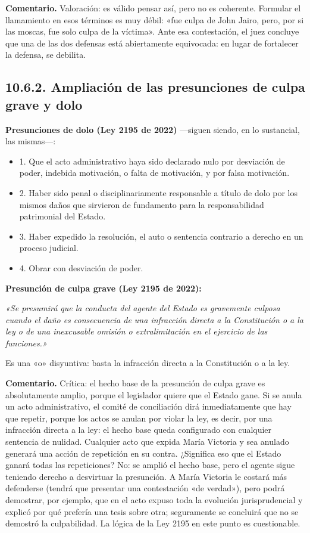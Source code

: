 \begin{comentario}
\textcolor[HTML]{8A6D3B}{\textbf{Comentario. }}Valoración: es válido pensar así, pero no es coherente. Formular el llamamiento en esos términos es muy débil: «fue culpa de John Jairo, pero, por si las moscas, fue solo culpa de la víctima». Ante esa contestación, el juez concluye que una de las dos defensas está abiertamente equivocada: en lugar de fortalecer la defensa, se debilita.
\end{comentario}
\subsection{10.6.2. Ampliación de las presunciones de culpa grave y dolo}
\textbf{Presunciones de dolo (Ley 2195 de 2022)} —siguen siendo, en lo sustancial, las mismas—:

\begin{itemize}
\item 1. Que el acto administrativo haya sido declarado nulo por desviación de poder, indebida motivación, o falta de motivación, y por falsa motivación.
\item 2. Haber sido penal o disciplinariamente responsable a título de dolo por los mismos daños que sirvieron de fundamento para la responsabilidad patrimonial del Estado.
\item 3. Haber expedido la resolución, el auto o sentencia contrario a derecho en un proceso judicial.
\item 4. Obrar con desviación de poder.
\end{itemize}
\textbf{Presunción de culpa grave (Ley 2195 de 2022):}

\begin{cita}
\textit{«Se presumirá que la conducta del agente del Estado es gravemente culposa cuando el daño es consecuencia de una infracción directa a la Constitución o a la ley o de una inexcusable omisión o extralimitación en el ejercicio de las funciones.»}
\end{cita}
Es una «o» disyuntiva: basta la infracción directa a la Constitución o a la ley.

\begin{comentario}
\textcolor[HTML]{8A6D3B}{\textbf{Comentario. }}Crítica: el hecho base de la presunción de culpa grave es absolutamente amplio, porque el legislador quiere que el Estado gane. Si se anula un acto administrativo, el comité de conciliación dirá inmediatamente que hay que repetir, porque los actos se anulan por violar la ley, es decir, por una infracción directa a la ley: el hecho base queda configurado con cualquier sentencia de nulidad. Cualquier acto que expida María Victoria y sea anulado generará una acción de repetición en su contra. ¿Significa eso que el Estado ganará todas las repeticiones? No: se amplió el hecho base, pero el agente sigue teniendo derecho a desvirtuar la presunción. A María Victoria le costará más defenderse (tendrá que presentar una contestación «de verdad»), pero podrá demostrar, por ejemplo, que en el acto expuso toda la evolución jurisprudencial y explicó por qué prefería una tesis sobre otra; seguramente se concluirá que no se demostró la culpabilidad. La lógica de la Ley 2195 en este punto es cuestionable.
\end{comentario}

